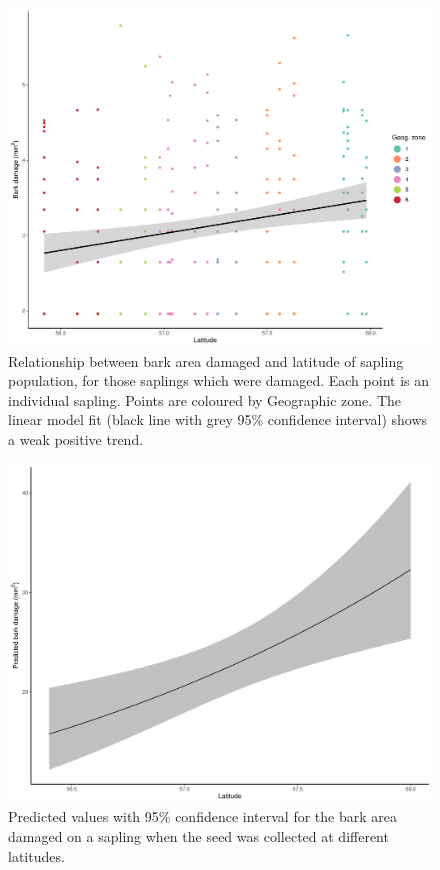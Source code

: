 \documentclass[a4paper, 11pt]{article}
\begin{document}
\begin{figure}
	\includegraphics[width=\textwidth]{latitude}
	\caption{Relationship between bark area damaged and latitude of sapling population, for those saplings which were damaged. Each point is an individual sapling. Points are coloured by Geographic zone. The linear model fit (black line with grey 95\% confidence interval) shows a weak positive trend.}
	\label{latitude}
\end{figure}

\begin{figure}
	\includegraphics[width=\textwidth]{pred_lat}
	\caption{Predicted values with 95\% confidence interval for the bark area damaged on a sapling when the seed was collected at different latitudes.}
\end{figure}
\end{document}
